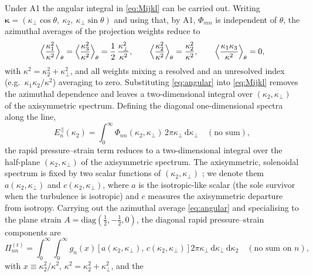 \documentclass[lineno]{JFM-FLM_Au}
\begin{document}
Under A1 the angular integral in \eqref{eq:Mijkl} can be carried out. Writing
$\boldsymbol{\kappa}=(\kappa_\perp\cos\theta,\ \kappa_2,\
\kappa_\perp\sin\theta)$ and using that, by A1, $\Phi_{mn}$ is independent of
$\theta$, the azimuthal averages of the projection weights reduce to
\begin{equation}
  \Bigl\langle \frac{\kappa_1^2}{\kappa^2}\Bigr\rangle_\theta
  = \Bigl\langle \frac{\kappa_3^2}{\kappa^2}\Bigr\rangle_\theta
  = \frac{1}{2}\,\frac{\kappa_\perp^2}{\kappa^2},
  \qquad
  \Bigl\langle \frac{\kappa_2^2}{\kappa^2}\Bigr\rangle_\theta
  = \frac{\kappa_2^2}{\kappa^2},
  \qquad
  \Bigl\langle \frac{\kappa_1\kappa_3}{\kappa^2}\Bigr\rangle_\theta = 0,
  \label{eq:angular}
\end{equation}
with $\kappa^2=\kappa_2^2+\kappa_\perp^2$, and all weights mixing a resolved
and an unresolved index (e.g.\ $\kappa_1\kappa_2/\kappa^2$) averaging to zero.
Substituting \eqref{eq:angular} into \eqref{eq:Mijkl} removes the azimuthal
dependence and leaves a two-dimensional integral over $(\kappa_2,\kappa_\perp)$
of the axisymmetric spectrum. Defining the diagonal one-dimensional spectra
along the line,
\begin{equation}
  E_n^{\,\|}(\kappa_2)
   = \int_0^\infty \Phi_{nn}(\kappa_2,\kappa_\perp)\,
     2\pi\kappa_\perp\,\mathrm{d}\kappa_\perp
   \quad(\text{no sum}),
   \label{eq:Epar}
\end{equation}
the rapid pressure--strain term reduces to a two-dimensional integral over the
half-plane $(\kappa_2,\kappa_\perp)$ of the axisymmetric spectrum. The
axisymmetric, solenoidal spectrum is fixed by two scalar functions of
$(\kappa_2,\kappa_\perp)$ \citep{Batchelor1946,ChandrasekharAxisym1950}; we
denote them $a(\kappa_2,\kappa_\perp)$ and $c(\kappa_2,\kappa_\perp)$, where
$a$ is the isotropic-like scalar (the sole survivor when the turbulence is
isotropic) and $c$ measures the axisymmetric departure from isotropy. Carrying
out the azimuthal average \eqref{eq:angular} and specialising to the plane
strain $A=\mathrm{diag}(\tfrac12,-\tfrac12,0)$, the diagonal rapid
pressure--strain components are
\begin{equation}
  \Pi^{(\mathrm r)}_{nn}
  = \int_{0}^{\infty}\!\!\int_{0}^{\infty}
      g_{n}(x)\,\bigl[\,a(\kappa_2,\kappa_\perp),\,c(\kappa_2,\kappa_\perp)\,\bigr]\,
      2\pi\kappa_\perp\,\mathrm{d}\kappa_\perp\,\mathrm{d}\kappa_2
   \quad(\text{no sum on }n),
  \label{eq:Piclosed}
\end{equation}
with $x\equiv\kappa_2^2/\kappa^2$, $\kappa^2=\kappa_2^2+\kappa_\perp^2$, and the
\end{document}
